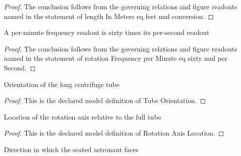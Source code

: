\begin{proof}
  The conclusion follows from the governing relations and figure readouts named in the statement of length In Meters eq feet mul conversion.
\end{proof}
\begin{lemma}
  \label{lem:physics:phyx-mini-0687:phyxminiproblems-problemphyxmini0687-rotationfrequency-perminute-eq-sixty-mul-persecond}
  A per-minute frequency readout is sixty times its per-second readout
\end{lemma}
\begin{proof}
  The conclusion follows from the governing relations and figure readouts named in the statement of rotation Frequency per Minute eq sixty mul per Second.
\end{proof}
\begin{definition}
  \label{def:physics:phyx-mini-0687:phyxminiproblems-problemphyxmini0687-tubeorientation}
  Orientation of the long centrifuge tube
\end{definition}
\begin{proof}
  This is the declared model definition of Tube Orientation.
\end{proof}
\begin{definition}
  \label{def:physics:phyx-mini-0687:phyxminiproblems-problemphyxmini0687-rotationaxislocation}
  Location of the rotation axis relative to the full tube
\end{definition}
\begin{proof}
  This is the declared model definition of Rotation Axis Location.
\end{proof}
\begin{definition}
  \label{def:physics:phyx-mini-0687:phyxminiproblems-problemphyxmini0687-astronautorientation}
  Direction in which the seated astronaut faces
\end{definition}
